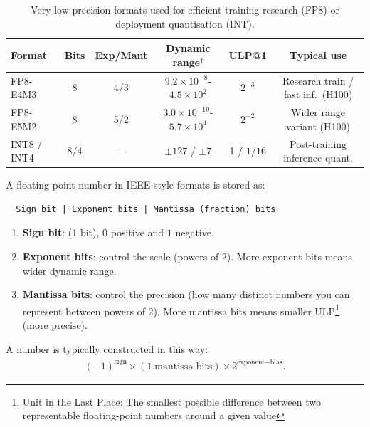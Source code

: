 \documentclass[11pt]{article}  %
\begin{document}
\begin{table}[ht]
\centering
\renewcommand{\arraystretch}{1.15}
\begin{tabular}{@{}lccccc@{}}
\toprule
\textbf{Format} & \textbf{Bits} & \textbf{Exp/Mant} &
\textbf{Dynamic range$^\dagger$} & \textbf{ULP@1} &
\textbf{Typical use} \\
\midrule
FP8-E4M3 & 8 & 4/3 & $9.2\!\times\!10^{-8}$-$4.5\!\times\!10^{2}$  & $2^{-3}$ & Research train / fast inf.\ (H100) \\
FP8-E5M2 & 8 & 5/2 & $3.0\!\times\!10^{-10}$-$5.7\!\times\!10^{4}$ & $2^{-2}$ & Wider range variant (H100) \\
INT8 / INT4 & 8/4 & — & $\pm127$ / $\pm7$ & 1 / $1/16$ & Post-training inference quant. \\
\bottomrule
\end{tabular}
\caption{Very low-precision formats used for efficient training research (FP8) or deployment quantisation (INT).}
\end{table}

A floating point number in IEEE-style formats is stored as:
\begin{verbatim}
  Sign bit | Exponent bits | Mantissa (fraction) bits
\end{verbatim}
\begin{enumerate}
  \item \textbf{Sign bit}: ($1$ bit), $0$ positive and $1$ negative.
  \item \textbf{Exponent bits}: control the scale (powers of $2$). 
  More exponent bits means wider dynamic range.
  \item \textbf{Mantissa bits}: control the precision (how many distinct numbers you can represent between powers of 2). More mantissa bits means smaller ULP\footnote{Unit in the Last Place: The smallest possible difference between two representable floating-point numbers around a given value} (more precise).
\end{enumerate}
A number is typically constructed in this way:
\begin{align*}
  (-1)^{\text{sign}} \times (1.\text{mantissa bits}) \times 2^{\text{exponent} - \text{bias}}.
\end{align*}
\end{document}
